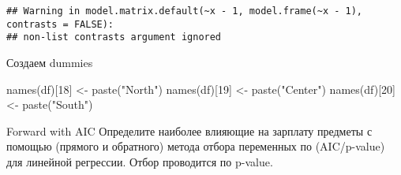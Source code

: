 \documentclass[
]{article}
\newenvironment{Shaded}{\begin{snugshade}}{\end{snugshade}}
\newcommand{\DecValTok}[1]{\textcolor[rgb]{0.00,0.00,0.81}{#1}}
\newcommand{\FunctionTok}[1]{\textcolor[rgb]{0.00,0.00,0.00}{#1}}
\newcommand{\NormalTok}[1]{#1}
\newcommand{\OtherTok}[1]{\textcolor[rgb]{0.56,0.35,0.01}{#1}}
\newcommand{\StringTok}[1]{\textcolor[rgb]{0.31,0.60,0.02}{#1}}
\begin{document}
\begin{verbatim}
## Warning in model.matrix.default(~x - 1, model.frame(~x - 1), contrasts = FALSE):
## non-list contrasts argument ignored
\end{verbatim}

Создаем dummies

\begin{Shaded}
\begin{Highlighting}[]
\FunctionTok{names}\NormalTok{(df)[}\DecValTok{18}\NormalTok{] }\OtherTok{\textless{}{-}} \FunctionTok{paste}\NormalTok{(}\StringTok{"North"}\NormalTok{)}
\FunctionTok{names}\NormalTok{(df)[}\DecValTok{19}\NormalTok{] }\OtherTok{\textless{}{-}} \FunctionTok{paste}\NormalTok{(}\StringTok{"Center"}\NormalTok{)}
\FunctionTok{names}\NormalTok{(df)[}\DecValTok{20}\NormalTok{] }\OtherTok{\textless{}{-}} \FunctionTok{paste}\NormalTok{(}\StringTok{"South"}\NormalTok{)}
\end{Highlighting}
\end{Shaded}

Forward with AIC Определите наиболее влияющие на зарплату предметы с
помощью (прямого и обратного) метода отбора переменных по (AIC/p-value)
для линейной регрессии. Отбор проводится по p-value.
\end{document}
